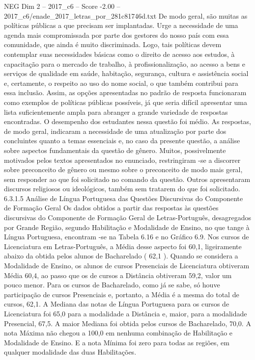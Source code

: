 \begin{textsample}{NEG Dim 2 – 2017\_c6 – Score -2.00 – 2017\_c6/enade\_2017\_letras\_por\_281c81746d.txt}
De modo geral, são muitas as políticas públicas a que precisam ser implantadas.
Urge a necessidade de uma agenda mais compromissada por parte dos gestores do nosso país com essa comunidade, que ainda é muito discriminada.
Logo, tais políticas devem contemplar suas necessidades básicas como o direito de acesso aos estudos, à capacitação para o mercado de trabalho, à profissionalização, ao acesso a bens e serviços de qualidade em saúde, habitação, segurança, cultura e assistência social e, certamente, o respeito ao uso do nome social, o que também contribui para essa inclusão.
Assim, as opções apresentadas no padrão de resposta funcionaram como exemplos de políticas públicas possíveis, já que seria difícil apresentar uma lista suficientemente ampla para abranger a grande variedade de respostas encontradas.
O desempenho dos estudantes nessa questão foi médio.
As respostas, de modo geral, indicaram a necessidade de uma atualização por parte dos concluintes quanto a temas essenciais e, no caso da presente questão, a análise sobre aspectos fundamentais da questão de gênero.
Muitos, possivelmente motivados pelos textos apresentados no enunciado, restringiram -se a discorrer sobre preconceito de gênero ou mesmo sobre o preconceito de modo mais geral, sem responder ao que foi solicitado no comando da questão.
Outros apresentaram discursos religiosos ou ideológicos, também sem tratarem do que foi solicitado. 6.3.1.5 Análise de Língua Portuguesa das Questões Discursivas do Componente de Formação Geral Os dados obtidos a partir das respostas às questões discursivas do Componente de Formação Geral de Letras-Português, desagregados por Grande Região, segundo Habilitação e Modalidade de Ensino, no que tange à Língua Portuguesa, encontram -se na Tabela 6.16 e no Gráfico 6.9.
Nos cursos de Licenciatura em Letras-Português, a Média desse aspecto foi 60,1, ligeiramente abaixo da obtida pelos alunos de Bacharelado ( 62,1 ).
Quando se considera a Modalidade de Ensino, os alunos de cursos Presenciais de Licenciatura obtiveram Média 60,4, ao passo que os de cursos a Distância obtiveram 59,2, valor um pouco menor.
Para os cursos de Bacharelado, como já se sabe, só houve participação de cursos Presenciais e, portanto, a Média é a mesma do total de cursos, 62,1.
A Mediana das notas de Língua Portuguesa para os cursos de Licenciatura foi 65,0 para a modalidade a Distância e, maior, para a modalidade Presencial, 67,5.
A maior Mediana foi obtida pelos cursos de Bacharelado, 70,0.
A nota Máxima não chegou a 100,0 em nenhuma combinação de Habilitação e Modalidade de Ensino.
E a nota Mínima foi zero para todas as regiões, em qualquer modalidade das duas Habilitações.

\end{textsample}

